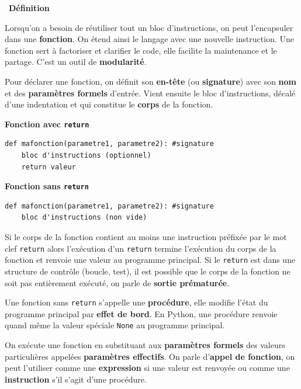 \documentclass[a4paper, french, 12pt]{article}  %
\newcounter{def}
\newenvironment{definition}[1]
{\par \medskip   \addtocounter{def}{1} \noindent  
\begin{bclogo}[arrondi =0.1,  ombre = true, barre=none, logo=\bcbook, marge=4]{~\textbf{Définition} \textbf{\thedef} {\itshape #1} }  \par}
{
\end{bclogo}
 \par \bigskip }
\newcounter{prog}
\begin{document}
 
\begin{definition}{}
Lorsqu'on a besoin de réutiliser tout un bloc  d'instructions, on peut l'encapsuler dans une \textbf{fonction}. On étend ainsi le langage avec une nouvelle instruction. Une fonction sert à factoriser et clarifier  le code, elle facilite la  maintenance et le partage. C'est un outil de \textbf{modularité}. 

Pour déclarer une fonction, on définit son \textbf{en-tête} (ou \textbf{signature}) avec  son \textbf{nom} et des \textbf{paramètres formels} d'entrée. Vient ensuite le bloc d'instructions,  décalé d'une indentation et qui constitue le \textbf{corps} de la fonction.

\begin{center}
\textbf{Fonction avec \texttt{return}}

\begin{lstlisting}[style=rond]
def mafonction(parametre1, parametre2): #signature
    bloc d'instructions (optionnel)
    return valeur
\end{lstlisting}


\textbf{Fonction sans \texttt{return}}

\begin{lstlisting}[style=rond]
def mafonction(parametre1, parametre2): #signature
    bloc d'instructions (non vide)
\end{lstlisting}
\end{center}


Si le corps de la  fonction contient au moins une instruction préfixée par le mot clef \texttt{return} alors l'exécution d'un \texttt{return}  termine l'exécution du corps de la fonction et renvoie une valeur au programme principal. Si le \texttt{return} est dans une structure de contrôle (boucle, test), il est possible que le corps de la fonction ne soit pas entièrement exécuté, on parle de \textbf{sortie prématurée}.

Une fonction sans \texttt{return} s'appelle une \textbf{procédure}, elle modifie l'état du programme principal par \textbf{effet de bord}. En Python, une procédure  renvoie quand même la valeur spéciale \texttt{None} au programme principal.  


\medskip

On exécute une fonction en substituant aux \textbf{paramètres formels} des valeurs particulières appelées \textbf{paramètres effectifs}.
On parle d'\textbf{appel de fonction}, on peut l'utiliser comme une \textbf{expression} si une valeur est renvoyée ou comme une \textbf{instruction} s'il s'agit d'une procédure. 


\end{definition}
\end{document}
